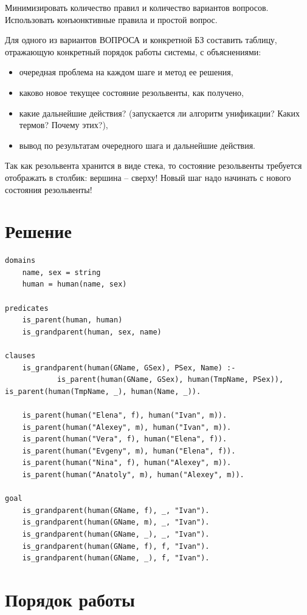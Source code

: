 \documentclass[12pt]{report}
\begin{document}
Минимизировать количество правил и количество вариантов вопросов. Использовать конъюнктивные правила и простой вопрос.

Для одного из вариантов ВОПРОСА и конкретной БЗ составить таблицу, отражающую конкретный порядок работы системы, с объяснениями:

\begin{itemize}
	\item очередная проблема на каждом шаге и метод ее решения,
	\item каково новое текущее состояние резольвенты, как получено,
	\item какие дальнейшие действия? (запускается ли алгоритм унификации? Каких термов? Почему этих?),
	\item вывод по результатам очередного шага и дальнейшие действия.
\end{itemize}

Так как резольвента хранится в виде стека, то состояние резольвенты требуется отображать в столбик: вершина – сверху! Новый шаг надо начинать с нового состояния резольвенты!

\newpage
\section*{Решение}

\begin{lstlisting}
domains
	name, sex = string
	human = human(name, sex)

predicates
	is_parent(human, human)
	is_grandparent(human, sex, name)

clauses
	is_grandparent(human(GName, GSex), PSex, Name) :- 
			is_parent(human(GName, GSex), human(TmpName, PSex)), is_parent(human(TmpName, _), human(Name, _)).
	
	is_parent(human("Elena", f), human("Ivan", m)).
	is_parent(human("Alexey", m), human("Ivan", m)).
	is_parent(human("Vera", f), human("Elena", f)).
	is_parent(human("Evgeny", m), human("Elena", f)).
	is_parent(human("Nina", f), human("Alexey", m)).
	is_parent(human("Anatoly", m), human("Alexey", m)).

goal
	is_grandparent(human(GName, f), _, "Ivan").
	is_grandparent(human(GName, m), _, "Ivan").
	is_grandparent(human(GName, _), _, "Ivan").
	is_grandparent(human(GName, f), f, "Ivan").
	is_grandparent(human(GName, _), f, "Ivan").
\end{lstlisting}

\section*{Порядок работы}
\end{document}
